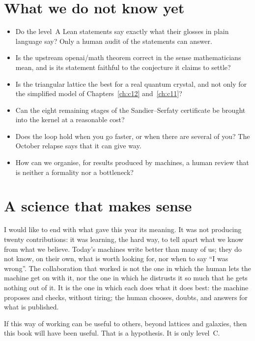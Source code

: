\section{What we do not know yet}

\begin{encadre}
\begin{itemize}
\item Do the level~A Lean statements say exactly what their glosses in plain language say? Only a human audit of the
statements can answer.
\item Is the upstream openai/math theorem correct in the sense mathematicians mean, and is its statement faithful to
the conjecture it claims to settle?
\item Is the triangular lattice the best for a real quantum crystal, and not only for the simplified model of
Chapters~\ref{ch:c12} and~\ref{ch:c11}?
\item Can the eight remaining stages of the Sandier--Serfaty certificate be brought into the kernel at a reasonable
cost?
\item Does the loop hold when you go faster, or when there are several of you? The October relapse says that it can
give way.
\item How can we organise, for results produced by machines, a human review that is neither a formality nor a
bottleneck?
\end{itemize}
\end{encadre}

\section{A science that makes sense}

I would like to end with what gave this year its meaning. It was not producing twenty contributions: it was learning,
the hard way, to tell apart what we know from what we believe. Today's machines write better than many of us; they do
not know, on their own, what is worth looking for, nor when to say ``I was wrong''. The collaboration that worked is
not the one in which the human lets the machine get on with it, nor the one in which he distrusts it so much that he
gets nothing out of it. It is the one in which each does what it does best: the machine proposes and checks, without
tiring; the human chooses, doubts, and answers for what is published.

If this way of working can be useful to others, beyond lattices and galaxies, then this book will have been useful.
That is a hypothesis. It is only level~C.
